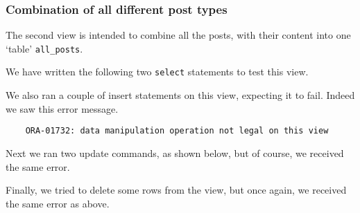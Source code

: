 \subsubsection{Combination of all different post types}

The second view is intended to combine all the posts, with their content into one `table' \verb`all_posts`.


We have written the following two \verb`select` statements to test this view.


We also ran a couple of insert statements on this view, expecting it to fail. Indeed we saw this error message.


\begin{verbatim}
	ORA-01732: data manipulation operation not legal on this view
\end{verbatim}

Next we ran two update commands, as shown below, but of course, we received the same error.


Finally, we tried to delete some rows from the view, but once again, we received the same error as above.

